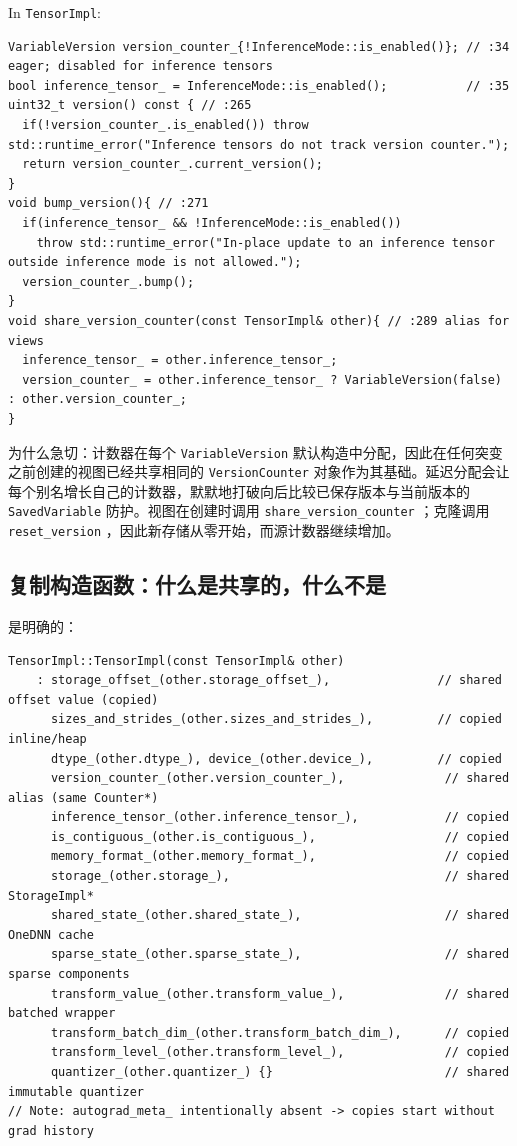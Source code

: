 In \texttt{TensorImpl}:

\begin{lstlisting}[caption={and version wiring.}, label=lst:versionwire]
VariableVersion version_counter_{!InferenceMode::is_enabled()}; // :34 eager; disabled for inference tensors
bool inference_tensor_ = InferenceMode::is_enabled();           // :35
uint32_t version() const { // :265
  if(!version_counter_.is_enabled()) throw std::runtime_error("Inference tensors do not track version counter.");
  return version_counter_.current_version();
}
void bump_version(){ // :271
  if(inference_tensor_ && !InferenceMode::is_enabled())
    throw std::runtime_error("In-place update to an inference tensor outside inference mode is not allowed.");
  version_counter_.bump();
}
void share_version_counter(const TensorImpl& other){ // :289 alias for views
  inference_tensor_ = other.inference_tensor_;
  version_counter_ = other.inference_tensor_ ? VariableVersion(false) : other.version_counter_;
}
\end{lstlisting}

为什么急切：计数器在每个 \texttt{VariableVersion} 默认构造中分配，因此在任何突变之前创建的视图已经共享相同的 \texttt{VersionCounter} 对象作为其基础。延迟分配会让每个别名增长自己的计数器，默默地打破向后比较已保存版本与当前版本的 \texttt{SavedVariable} 防护。视图在创建时调用 \texttt{share\_version\_counter} ；克隆调用 \texttt{reset\_version} ，因此新存储从零开始，而源计数器继续增加。

\subsection{复制构造函数：什么是共享的，什么不是}
\label{sec:copyctor}

是明确的：

\begin{lstlisting}[caption={copy ctor sharing.}, label=lst:copyctor-mem]
TensorImpl::TensorImpl(const TensorImpl& other)
    : storage_offset_(other.storage_offset_),               // shared offset value (copied)
      sizes_and_strides_(other.sizes_and_strides_),         // copied inline/heap
      dtype_(other.dtype_), device_(other.device_),         // copied
      version_counter_(other.version_counter_),              // shared alias (same Counter*)
      inference_tensor_(other.inference_tensor_),            // copied
      is_contiguous_(other.is_contiguous_),                  // copied
      memory_format_(other.memory_format_),                  // copied
      storage_(other.storage_),                              // shared StorageImpl*
      shared_state_(other.shared_state_),                    // shared OneDNN cache
      sparse_state_(other.sparse_state_),                    // shared sparse components
      transform_value_(other.transform_value_),              // shared batched wrapper
      transform_batch_dim_(other.transform_batch_dim_),      // copied
      transform_level_(other.transform_level_),              // copied
      quantizer_(other.quantizer_) {}                        // shared immutable quantizer
// Note: autograd_meta_ intentionally absent -> copies start without grad history
\end{lstlisting}

